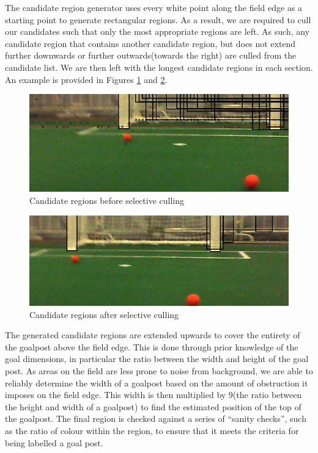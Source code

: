 \documentclass[runningheads,a4paper]{llncs}
\begin{document}
The candidate region generator uses every white point along the field edge as a starting point to generate rectangular regions. As a result, we are required to cull our candidates such that only the most appropriate regions are left. As such, any candidate region that contains another candidate region, but does not extend further downwards or further outwards(towards the right) are culled from the candidate list. We are then left with the longest candidate regions in each section. An example is provided in Figures \ref{fig:precull} and \ref{fig:postcull}.
\begin{figure}[!ht]
\includegraphics[scale=0.6]{Figures/precull}
\caption{Candidate regions before selective culling}\label{fig:precull}
\end{figure}
\begin{figure}
\includegraphics[scale=0.6]{Figures/postcull}
\caption{Candidate regions after selective culling}\label{fig:postcull}
\end{figure}

The generated candidate regions are extended upwards to cover the entirety of the goalpost above the field edge. This is done through prior knowledge of the goal dimensions, in particular the ratio between the width and height of the goal post. As areas on the field are less prone to noise from background, we are able to reliably determine the width of a goalpost based on the amount of obstruction it imposes on the field edge. This width is then multiplied by 9(the ratio between the height and width of a goalpost) to find the estimated position of the top of the goalpost. The final region is checked against a series of ``sanity checks'', such as the ratio of colour within the region, to ensure that it meets the criteria for being labelled a goal post.
\end{document}
